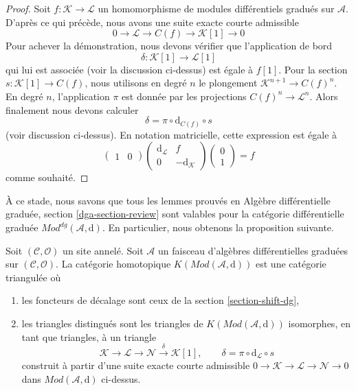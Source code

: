 \begin{proof}
Soit $f : \mathcal{K} \to \mathcal{L}$ un
homomorphisme de modules différentiels gradués sur $\mathcal{A}$. D'après
ce qui précède, nous avons une suite exacte courte admissible
$$
0 \to \mathcal{L} \to C(f) \to \mathcal{K}[1] \to 0
$$ Pour
achever la démonstration, nous devons vérifier que l'application de
bord $$
\delta : \mathcal{K}[1] \to \mathcal{L}[1]
$$
qui lui est associée (voir la discussion ci-dessus) est égale à $f[1]$.
Pour la section $s : \mathcal{K}[1] \to C(f)$, nous utilisons en
degré $n$ le plongement $\mathcal{K}^{n + 1} \to C(f)^n$. En degré
$n$, l'application $\pi$ est donnée par les projections
$C(f)^n \to \mathcal{L}^n$. Alors finalement nous devons calculer
$$
\delta = \pi \circ \text{d}_{C(f)} \circ s
$$ (voir
discussion ci-dessus). En notation matricielle, cette expression est
égale à $$
\left(
\begin{matrix}
1
& 0 \end{matrix}
\right)
\left(
\begin{matrix}
\text{d}_\mathcal{L} & f \\
0 & -\text{d}_\mathcal{K}
\end{matrix}
\right)
\left(
\begin{matrix} 0
\\
1
\end{matrix}
\right) = f
$$
comme souhaité.
\end{proof}

\noindent À
ce stade, nous savons que tous les lemmes prouvés en
Algèbre différentielle graduée, section \ref{dga-section-review} sont
valables pour la catégorie différentielle graduée
$\textit{Mod}^{dg}(\mathcal{A}, \text{d})$. En particulier,
nous obtenons la proposition suivante.

\begin{proposition}
\label{proposition-homotopy-category-triangulated}
Soit $(\mathcal{C}, \mathcal{O})$ un site annelé. Soit
$\mathcal{A}$ un faisceau d'algèbres différentielles graduées
sur $(\mathcal{C}, \mathcal{O})$.
La catégorie homotopique $K(\textit{Mod}(\mathcal{A}, \text{d}))$
est une catégorie triangulée
où \begin{enumerate}
\item les foncteurs de décalage sont ceux de la
section \ref{section-shift-dg},
\item les triangles distingués sont les triangles de
$K(\textit{Mod}(\mathcal{A}, \text{d}))$ isomorphes, en
tant que triangles, à un triangle
$$
\mathcal{K} \to \mathcal{L} \to \mathcal{N}
\xrightarrow{\delta} \mathcal{K}[1],\quad\quad
\delta = \pi \circ \text{d}_\mathcal{L} \circ s
$$ construit
à partir d'une suite exacte courte admissible
$0 \to \mathcal{K} \to \mathcal{L} \to \mathcal{N} \to 0$ dans
$\textit{Mod}(\mathcal{A}, \text{d})$ ci-dessus.
\end{enumerate}
\end{proposition}

